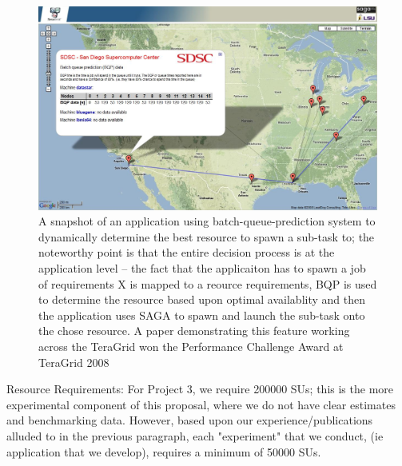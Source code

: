 \documentclass[a4paper,10pt]{article}
\begin{document}
\begin{figure}
\begin{center}
\includegraphics[scale=0.33]{gmaps_bqp.jpg}
\end{center}
\caption{A snapshot of an application using batch-queue-prediction system to dynamically determine the 
best resource to spawn a sub-task to; the noteworthy point is that the entire decision process is at the 
application level -- the fact that the applicaiton has to spawn a job of requirements X is mapped to a
reource requirements, BQP is used to determine the resource based upon optimal availablity and then the 
application uses SAGA to spawn and launch the sub-task onto the chose resource. A paper demonstrating
this feature working across the TeraGrid won the Performance Challenge Award at TeraGrid 2008}
\label{}
\end{figure}

Resource Requirements: For Project 3, we require 200000 SUs; this is the more experimental component
of this proposal, where we do not have clear estimates and benchmarking data. However, based upon our experience/publications alluded to in the previous paragraph, each 
"experiment" that we conduct, (ie application that we develop), requires a minimum of 50000 SUs.



\end{document}
